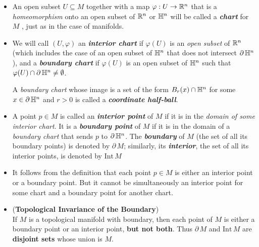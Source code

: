 \documentclass[11pt]{article}
\begin{document}
\begin{itemize}
\item \begin{definition}
An open subset $U \subseteq M$ together with a map $\varphi: U \rightarrow {\mathbb R}^n$ that is a \emph{homeomorphism} onto an open subset of ${\mathbb R}^n$ or ${\mathbb H}^n$ will be called a \emph{\textbf{chart}} for $M$ , just as in the case of manifolds.
\end{definition}

\item \begin{definition}
We will call $(U, \varphi)$ an \emph{\textbf{interior chart}} if $\varphi(U)$ is an \emph{open subset} of ${\mathbb R}^n$ (which includes the case of an open subset of ${\mathbb H}^n$ that does not intersect $\partial\,{\mathbb H}^n$), and a \emph{\textbf{boundary chart}} if $\varphi(U)$ is an open subset of ${\mathbb H}^n$ such that $\varphi(U) \cap \partial\,{\mathbb H}^n \neq \emptyset$. 

A \emph{boundary chart} whose image is a set of the form $B_r(x) \cap {\mathbb H}^n$ for some $x \in \partial\,{\mathbb H}^n$ and $r > 0$ is called a \emph{\textbf{coordinate half-ball}}.
\end{definition}

\item \begin{definition}
A point $p \in M$ is called an \emph{\textbf{interior point}} of $M$ if it is in the \emph{domain of some interior chart}. It is a \emph{\textbf{boundary point}} of $M$ if it is in the domain of a \emph{boundary chart} that sends $p$ to $\partial\,{\mathbb H}^n$. The \emph{\textbf{boundary}} of $M$ (the set of all its boundary points) is denoted by $\partial\,M$; similarly, its \emph{\textbf{interior}}, the set of all its interior points, is denoted by $\text{Int}\,M$
\end{definition}

\item It follows from the definition that each point $p \in M$ is either an interior point or a
boundary point. But it cannot be simultaneously an interior point for some chart and a boundary point for another chart.

\item \begin{theorem} (\textbf{Topological Invariance of the Boundary}) \citep{lee2003introduction} \\
If $M$ is a topological manifold with boundary, then each point of $M$ is either a boundary point or an interior point, \textbf{but not both}. Thus $\partial\,M$ and $\text{Int}\, M$ are \textbf{disjoint sets} whose union is $M$.
\end{theorem}


\end{itemize}
\end{document}
